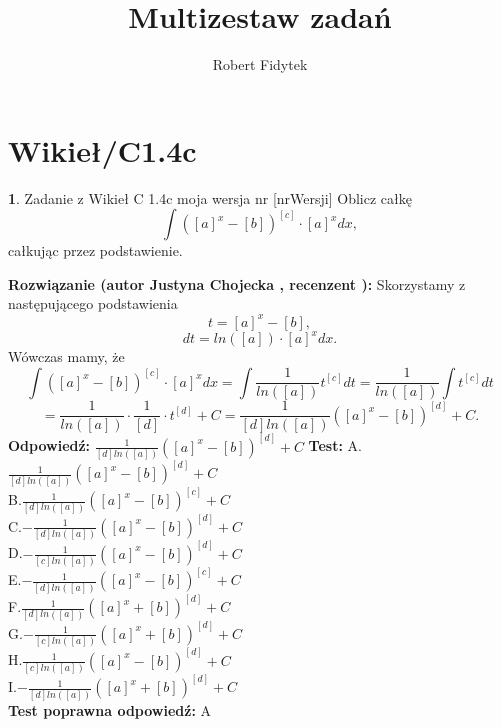 \documentclass[12pt, a4paper]{article}
\title{Multizestaw zadań}
\author{Robert Fidytek}
\date{}
\theoremstyle{definition} %
\newtheorem{zad}{}
\newcommand{\kategoria}[1]{\section{#1}} %
\newcommand{\zadStart}[1]{\begin{zad}#1\newline} %
\newcommand{\zadStop}{\end{zad}}   %
\newcommand{\rozwStart}[2]{\noindent \textbf{Rozwiązanie (autor #1 , recenzent #2): }\newline} %
\newcommand{\rozwStop}{\newline}                                            %
\newcommand{\odpStart}{\noindent \textbf{Odpowiedź:}\newline}    %
\newcommand{\odpStop}{\newline}                                             %
\newcommand{\testStart}{\noindent \textbf{Test:}\newline} %
\newcommand{\testStop}{\newline} %
\newcommand{\kluczStart}{\noindent \textbf{Test poprawna odpowiedź:}\newline} %
\newcommand{\kluczStop}{\newline} %
\begin{document}
\maketitle
\kategoria{Wikieł/C1.4c}
\zadStart{Zadanie z Wikieł C 1.4c moja wersja nr [nrWersji]}
Oblicz całkę $$\int \left([a]^{x}-[b]\right)^{[c]}\cdot [a]^{x} dx,$$ całkując przez podstawienie.
\zadStop
\rozwStart{Justyna Chojecka}{}
Skorzystamy z następującego podstawienia
$$t=[a]^{x}-[b],$$
$$dt=ln([a])\cdot [a]^{x}dx.$$
Wówczas mamy, że
$$\int \left([a]^{x}-[b]\right)^{[c]}\cdot [a]^{x} dx=\int \frac{1}{ln([a])}t^{[c]}dt=\frac{1}{ln([a])}\int t^{[c]}dt$$$$=\frac{1}{ln([a])}\cdot \frac{1}{[d]}\cdot t^{[d]}+C=\frac{1}{[d]ln([a])}\left([a]^{x}-[b]\right)^{[d]}+C.$$
\rozwStop
\odpStart
$\frac{1}{[d]ln([a])}\left([a]^{x}-[b]\right)^{[d]}+C$
\odpStop
\testStart
A.$\frac{1}{[d]ln([a])}\left([a]^{x}-[b]\right)^{[d]}+C$\\
B.$\frac{1}{[d]ln([a])}\left([a]^{x}-[b]\right)^{[c]}+C$\\
C.$-\frac{1}{[d]ln([a])}\left([a]^{x}-[b]\right)^{[d]}+C$\\
D.$-\frac{1}{[c]ln([a])}\left([a]^{x}-[b]\right)^{[d]}+C$\\
E.$-\frac{1}{[d]ln([a])}\left([a]^{x}-[b]\right)^{[c]}+C$\\
F.$\frac{1}{[d]ln([a])}\left([a]^{x}+[b]\right)^{[d]}+C$\\
G.$-\frac{1}{[c]ln([a])}\left([a]^{x}+[b]\right)^{[d]}+C$\\
H.$\frac{1}{[c]ln([a])}\left([a]^{x}-[b]\right)^{[d]}+C$\\
I.$-\frac{1}{[d]ln([a])}\left([a]^{x}+[b]\right)^{[d]}+C$\\
\testStop
\kluczStart
A
\kluczStop
\end{document}
